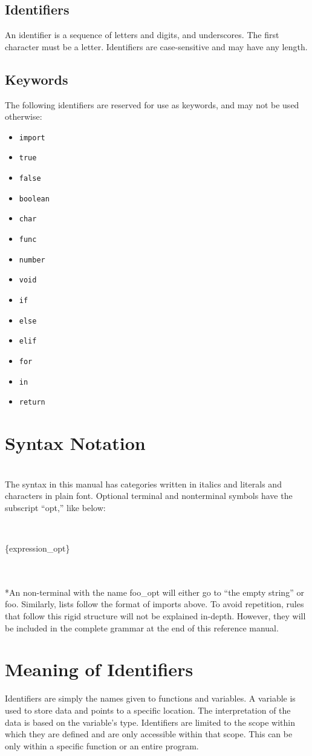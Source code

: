 \documentclass[11pt]{article}
\begin{document}
\subsection{Identifiers}
An identifier is a sequence of letters and digits, and underscores. The first character must be a letter. Identifiers are case-sensitive and may have any length.
\subsection{Keywords}
The following identifiers are reserved for use as keywords, and may not be used otherwise:
\begin{itemize}
\item
\verb!import!
\item
\verb!true!
\item
\verb!false!
\item
\verb!boolean!
\item
\verb!char!
\item
\verb!func!
\item
\verb!number!
\item
\verb!void!
\item
\verb!if!
\item
\verb!else!
\item
\verb!elif!
\item
\verb!for!
\item
\verb!in!
\item
\verb!return!
\end{itemize}

\section{Syntax Notation}
\\ The syntax in this manual has categories written in italics and literals and characters in
plain font. Optional terminal and nonterminal symbols have the subscript ``opt,'' like below:

\\ \centerline{\{expression\_opt\}}

\\ \\*An non-terminal with the name foo\_opt will either go to ``the empty string'' or foo. Similarly, lists follow the format of imports above. To avoid repetition, rules that follow this rigid structure will not be explained in-depth. However, they will be included in the complete grammar at the end of this reference manual.
\section{Meaning of Identifiers}
Identifiers are simply the names given to functions and variables. A variable is used to store data and points to a specific location. The interpretation of the data is based on the variable's type. Identifiers are limited to the scope within which they are defined and are only accessible within that scope. This can be only within a specific function or an entire program.
\end{document}
